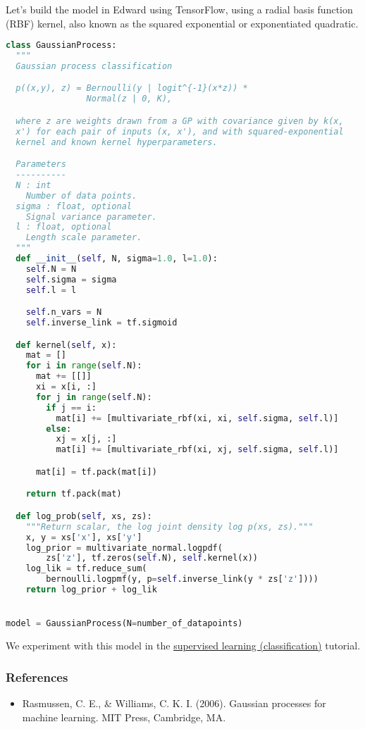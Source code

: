 Let's build the model in Edward using TensorFlow, using a radial basis function
(RBF) kernel, also known as the squared exponential or exponentiated quadratic.
\begin{lstlisting}[language=Python]
class GaussianProcess:
  """
  Gaussian process classification

  p((x,y), z) = Bernoulli(y | logit^{-1}(x*z)) *
                Normal(z | 0, K),

  where z are weights drawn from a GP with covariance given by k(x,
  x') for each pair of inputs (x, x'), and with squared-exponential
  kernel and known kernel hyperparameters.

  Parameters
  ----------
  N : int
    Number of data points.
  sigma : float, optional
    Signal variance parameter.
  l : float, optional
    Length scale parameter.
  """
  def __init__(self, N, sigma=1.0, l=1.0):
    self.N = N
    self.sigma = sigma
    self.l = l

    self.n_vars = N
    self.inverse_link = tf.sigmoid

  def kernel(self, x):
    mat = []
    for i in range(self.N):
      mat += [[]]
      xi = x[i, :]
      for j in range(self.N):
        if j == i:
          mat[i] += [multivariate_rbf(xi, xi, self.sigma, self.l)]
        else:
          xj = x[j, :]
          mat[i] += [multivariate_rbf(xi, xj, self.sigma, self.l)]

      mat[i] = tf.pack(mat[i])

    return tf.pack(mat)

  def log_prob(self, xs, zs):
    """Return scalar, the log joint density log p(xs, zs)."""
    x, y = xs['x'], xs['y']
    log_prior = multivariate_normal.logpdf(
        zs['z'], tf.zeros(self.N), self.kernel(x))
    log_lik = tf.reduce_sum(
        bernoulli.logpmf(y, p=self.inverse_link(y * zs['z'])))
    return log_prior + log_lik


model = GaussianProcess(N=number_of_datapoints)
\end{lstlisting}

We experiment with this model in the
\href{tut_supervised_classification.html}{supervised learning (classification)} tutorial.

\subsubsection{References}\label{references}

\begin{itemize}
\item
  Rasmussen, C. E., \& Williams, C. K. I. (2006). Gaussian processes
  for machine learning. MIT Press, Cambridge, MA.
\end{itemize}

